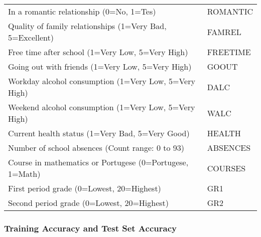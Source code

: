 \documentclass[sigconf]{acmart}
\begin{document}
\begin{table*}[ht]
\begin{tabular}{ll}
    In a romantic relationship (0=No, 1=Tes) & ROMANTIC  \\
    Quality of family relationships (1=Very Bad, 5=Excellent) & FAMREL  \\
    Free time after school (1=Very Low, 5=Very High) & FREETIME  \\
    Going out with friends (1=Very Low, 5=Very High) & GOOUT  \\
    Workday alcohol consumption (1=Very Low, 5=Very High) & DALC  \\
    Weekend alcohol consumption (1=Very Low, 5=Very High) & WALC  \\
    Current health status (1=Very Bad, 5=Very Good) & HEALTH  \\ 
    Number of school absences (Count range: 0 to 93) & ABSENCES  \\
    Course in mathematics or Portugese (0=Portugese, 1=Math) & COURSES  \\
    First period grade (0=Lowest, 20=Highest) & GR1  \\
    Second period grade (0=Lowest, 20=Highest) & GR2  \\
    \bottomrule
  \end{tabular}
\end{table*}



\subsubsection{Training Accuracy and Test Set Accuracy}
\end{document}
